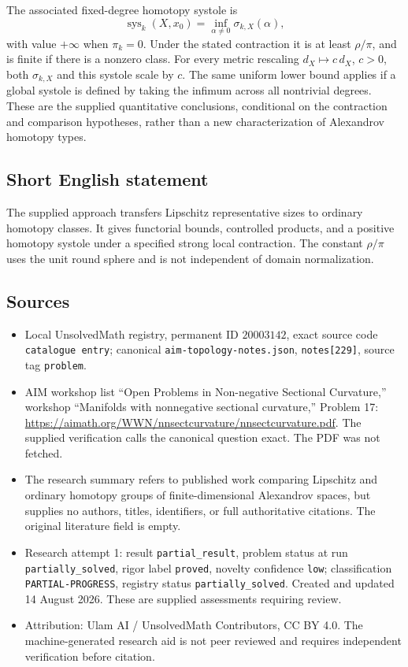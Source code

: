 \documentclass[11pt]{article}
\begin{document}
The associated fixed-degree homotopy systole is
\[
 \operatorname{sys}_k(X,x_0)=\inf_{\alpha\ne0}\sigma_{k,X}(\alpha),
\]
with value \(+\infty\) when \(\pi_k=0\). Under the stated contraction it is at least \(\rho/\pi\), and is finite if there is a nonzero class. For every metric rescaling \(d_X\mapsto c\,d_X\), \(c>0\), both \(\sigma_{k,X}\) and this systole scale by \(c\). The same uniform lower bound applies if a global systole is defined by taking the infimum across all nontrivial degrees. These are the supplied quantitative conclusions, conditional on the contraction and comparison hypotheses, rather than a new characterization of Alexandrov homotopy types.
\subsection{Short English statement}
The supplied approach transfers Lipschitz representative sizes to ordinary homotopy classes. It gives functorial bounds, controlled products, and a positive homotopy systole under a specified strong local contraction. The constant \(\rho/\pi\) uses the unit round sphere and is not independent of domain normalization.
\subsection{Sources}
\begin{itemize}
\item Local UnsolvedMath registry, permanent ID \(20003142\), exact source code \texttt{catalogue entry}; canonical \texttt{aim-topology-notes.json}, \texttt{notes[229]}, source tag \texttt{problem}.
\item AIM workshop list ``Open Problems in Non-negative Sectional Curvature,'' workshop ``Manifolds with nonnegative sectional curvature,'' Problem 17: \url{https://aimath.org/WWN/nnsectcurvature/nnsectcurvature.pdf}. The supplied verification calls the canonical question exact. The PDF was not fetched.
\item The research summary refers to published work comparing Lipschitz and ordinary homotopy groups of finite-dimensional Alexandrov spaces, but supplies no authors, titles, identifiers, or full authoritative citations. The original literature field is empty.
\item Research attempt 1: result \texttt{partial\_result}, problem status at run \texttt{partially\_solved}, rigor label \texttt{proved}, novelty confidence \texttt{low}; classification \texttt{PARTIAL-PROGRESS}, registry status \texttt{partially\_solved}. Created and updated 14 August 2026. These are supplied assessments requiring review.
\item Attribution: Ulam AI / UnsolvedMath Contributors, CC BY 4.0. The machine-generated research aid is not peer reviewed and requires independent verification before citation.
\end{itemize}
\end{document}
